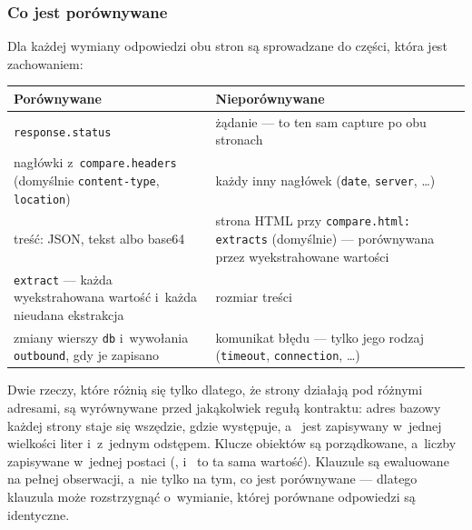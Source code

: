\subsubsection{Co jest porównywane}

Dla każdej wymiany odpowiedzi obu stron są sprowadzane do części, która jest zachowaniem:

{\small
\begin{tabularx}{\linewidth}{@{}>{\raggedright\arraybackslash}X >{\raggedright\arraybackslash}X@{}}
\toprule
Porównywane & Nieporównywane \\
\midrule
\texttt{response.status} & żądanie --- to ten sam capture po obu stronach \\
nagłówki z~\texttt{compare.headers} (domyślnie \texttt{content-type}, \texttt{location}) &
każdy inny nagłówek (\texttt{date}, \texttt{server}, …) \\
treść: JSON, tekst albo base64 & strona HTML przy \texttt{compare.html: extracts} (domyślnie)
--- porównywana przez wyekstrahowane wartości \\
\texttt{extract} --- każda wyekstrahowana wartość i~każda nieudana ekstrakcja & rozmiar
treści \\
zmiany wierszy \texttt{db} i~wywołania \texttt{outbound}, gdy je zapisano & komunikat błędu
--- tylko jego rodzaj (\texttt{timeout}, \texttt{connection}, …) \\
\bottomrule
\end{tabularx}
}

Dwie rzeczy, które różnią się tylko dlatego, że strony działają pod różnymi adresami, są
wyrównywane przed jakąkolwiek regułą kontraktu: adres bazowy każdej strony staje się
 wszędzie, gdzie występuje, a~ jest zapisywany w~jednej wielkości liter i~z~jednym odstępem. Klucze obiektów są porządkowane, a~liczby
zapisywane w~jednej postaci (,  i~ to ta sama
wartość). Klauzule są ewaluowane na pełnej obserwacji, a~nie tylko na tym, co jest
porównywane --- dlatego klauzula może rozstrzygnąć o~wymianie, której porównane odpowiedzi
są identyczne.

